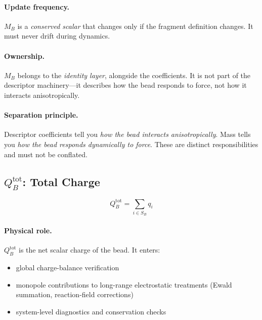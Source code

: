 \documentclass[11pt]{article}
\begin{document}
\paragraph{Update frequency.}
$M_B$ is a \emph{conserved scalar} that changes only if the fragment
definition changes.  It must never drift during dynamics.

\paragraph{Ownership.}
$M_B$ belongs to the \emph{identity layer}, alongside the coefficients.
It is not part of the descriptor machinery---it describes how the bead
responds to force, not how it interacts anisotropically.

\paragraph{Separation principle.}
Descriptor coefficients tell you \emph{how the bead interacts
anisotropically}.  Mass tells you \emph{how the bead responds dynamically
to force}.  These are distinct responsibilities and must not be conflated.

\subsection{$Q_B^{\mathrm{tot}}$: Total Charge}

\begin{equation}
    Q_B^{\mathrm{tot}} = \sum_{i \in S_B} q_i
\end{equation}

\paragraph{Physical role.}
$Q_B^{\mathrm{tot}}$ is the net scalar charge of the bead.  It enters:
\begin{itemize}
    \item global charge-balance verification
    \item monopole contributions to long-range electrostatic treatments
          (Ewald summation, reaction-field corrections)
    \item system-level diagnostics and conservation checks
\end{itemize}
\end{document}

